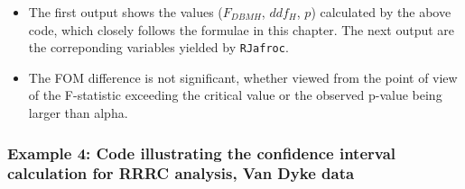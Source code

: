 \documentclass[
]{book}
\newenvironment{Shaded}{\begin{snugshade}}{\end{snugshade}}
\newcommand{\CommentTok}[1]{\textcolor[rgb]{0.56,0.35,0.01}{\textit{#1}}}
\newcommand{\DecValTok}[1]{\textcolor[rgb]{0.00,0.00,0.81}{#1}}
\newcommand{\NormalTok}[1]{#1}
\newcommand{\OperatorTok}[1]{\textcolor[rgb]{0.81,0.36,0.00}{\textbf{#1}}}
\newcommand{\StringTok}[1]{\textcolor[rgb]{0.31,0.60,0.02}{#1}}
\begin{document}
\begin{Shaded}
\end{Shaded}

\begin{itemize}
\item
  The first output shows the values (\(F_{DBMH}\), \(ddf_H\), \(p\)) calculated by the above code, which closely follows the formulae in this chapter. The next output are the correponding variables yielded by \texttt{RJafroc}.
\item
  The FOM difference is not significant, whether viewed from the point of view of the F-statistic exceeding the critical value or the observed p-value being larger than alpha.
\end{itemize}

\hypertarget{example-4-code-illustrating-the-confidence-interval-calculation-for-rrrc-analysis-van-dyke-data}{%
\subsubsection{Example 4: Code illustrating the confidence interval calculation for RRRC analysis, Van Dyke data}\label{example-4-code-illustrating-the-confidence-interval-calculation-for-rrrc-analysis-van-dyke-data}}
\end{document}
